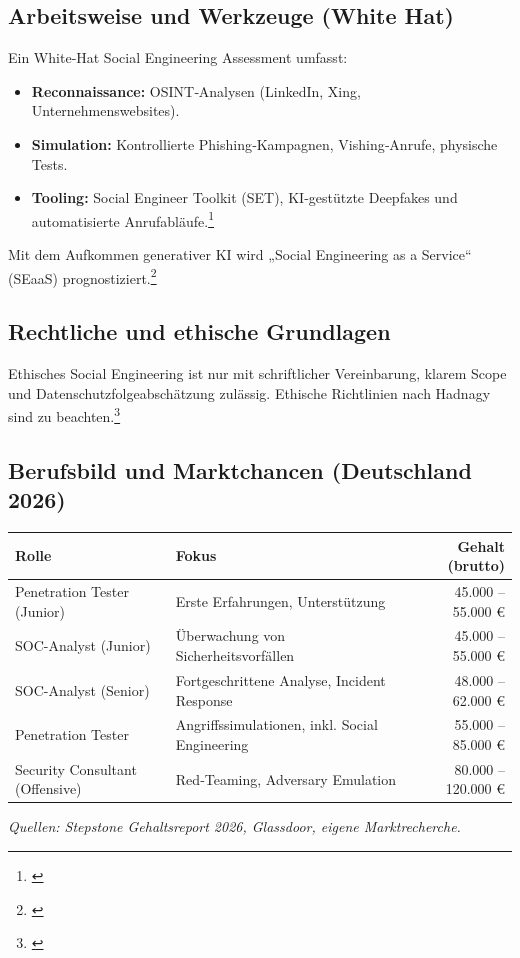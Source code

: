 \documentclass[10pt,a4paper]{article}
\begin{document}
	\subsection{Arbeitsweise und Werkzeuge (White Hat)}
	Ein White‑Hat Social Engineering Assessment umfasst:
	\begin{itemize}
		\item \textbf{Reconnaissance:} OSINT‑Analysen (LinkedIn, Xing, Unternehmenswebsites).
		\item \textbf{Simulation:} Kontrollierte Phishing‑Kampagnen, Vishing‑Anrufe, physische Tests.
		\item \textbf{Tooling:} Social Engineer Toolkit (SET), KI‑gestützte Deepfakes und automatisierte Anrufabläufe.\footnote{\cite{TrustedSec:SET}}
	\end{itemize}
	Mit dem Aufkommen generativer KI wird „Social Engineering as a Service“ (SEaaS) prognostiziert.\footnote{\cite{ECSO:TL2026}}
	
	\subsection{Rechtliche und ethische Grundlagen}
	Ethisches Social Engineering ist nur mit schriftlicher Vereinbarung, klarem Scope und Datenschutzfolgeabschätzung zulässig. Ethische Richtlinien nach Hadnagy sind zu beachten.\footnote{\cite{Hadnagy:2018}}
	
	\subsection{Berufsbild und Marktchancen (Deutschland 2026)}
	\begin{center}
		\begin{tabular}{@{}l l r@{}}
			\toprule
			\textbf{Rolle} & \textbf{Fokus} & \textbf{Gehalt (brutto)} \\
			\midrule
			Penetration Tester (Junior) & Erste Erfahrungen, Unterstützung & 45.000 – 55.000 € \\
			SOC-Analyst (Junior) & Überwachung von Sicherheitsvorfällen & 45.000 – 55.000 € \\
			SOC-Analyst (Senior) & Fortgeschrittene Analyse, Incident Response & 48.000 – 62.000 € \\
			Penetration Tester & Angriffssimulationen, inkl. Social Engineering & 55.000 – 85.000 € \\
			Security Consultant (Offensive) & Red‑Teaming, Adversary Emulation & 80.000 – 120.000 € \\
			\bottomrule
		\end{tabular}
	\end{center}
	\emph{Quellen: Stepstone Gehaltsreport 2026, Glassdoor, eigene Marktrecherche.}
	
\end{document}
